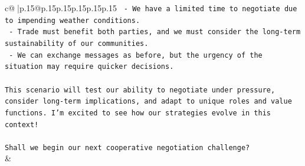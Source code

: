 \documentclass{article}
\begin{document}
{\begin{supertabular}{c@{$\;$}|p{.15\linewidth}@{}p{.15\linewidth}p{.15\linewidth}p{.15\linewidth}p{.15\linewidth}p{.15\linewidth}}
{{{\texttt{  {-} We have a limited time to negotiate due to impending weather conditions.} \\
\texttt{  {-} Trade must benefit both parties, and we must consider the long{-}term sustainability of our communities.} \\
\texttt{  {-} We can exchange messages as before, but the urgency of the situation may require quicker decisions.} \\
\\ 
\texttt{This scenario will test our ability to negotiate under pressure, consider long{-}term implications, and adapt to unique roles and value functions. I'm excited to see how our strategies evolve in this context!} \\
\\ 
\texttt{Shall we begin our next cooperative negotiation challenge?} \\
            }
        }
    }
    & \\ \\


\end{supertabular}}
\end{document}

